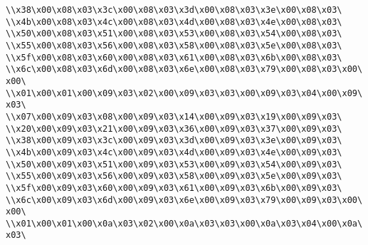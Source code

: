\verb|\\x38\x00\x08\x03\x3c\x00\x08\x03\x3d\x00\x08\x03\x3e\x00\x08\x03\|\newline
\verb|\\x4b\x00\x08\x03\x4c\x00\x08\x03\x4d\x00\x08\x03\x4e\x00\x08\x03\|\newline
\verb|\\x50\x00\x08\x03\x51\x00\x08\x03\x53\x00\x08\x03\x54\x00\x08\x03\|\newline
\verb|\\x55\x00\x08\x03\x56\x00\x08\x03\x58\x00\x08\x03\x5e\x00\x08\x03\|\newline
\verb|\\x5f\x00\x08\x03\x60\x00\x08\x03\x61\x00\x08\x03\x6b\x00\x08\x03\|\newline
\verb|\\x6c\x00\x08\x03\x6d\x00\x08\x03\x6e\x00\x08\x03\x79\x00\x08\x03\x00\x00\|\newline
\verb|\\x01\x00\x01\x00\x09\x03\x02\x00\x09\x03\x03\x00\x09\x03\x04\x00\x09\x03\|\newline
\verb|\\x07\x00\x09\x03\x08\x00\x09\x03\x14\x00\x09\x03\x19\x00\x09\x03\|\newline
\verb|\\x20\x00\x09\x03\x21\x00\x09\x03\x36\x00\x09\x03\x37\x00\x09\x03\|\newline
\verb|\\x38\x00\x09\x03\x3c\x00\x09\x03\x3d\x00\x09\x03\x3e\x00\x09\x03\|\newline
\verb|\\x4b\x00\x09\x03\x4c\x00\x09\x03\x4d\x00\x09\x03\x4e\x00\x09\x03\|\newline
\verb|\\x50\x00\x09\x03\x51\x00\x09\x03\x53\x00\x09\x03\x54\x00\x09\x03\|\newline
\verb|\\x55\x00\x09\x03\x56\x00\x09\x03\x58\x00\x09\x03\x5e\x00\x09\x03\|\newline
\verb|\\x5f\x00\x09\x03\x60\x00\x09\x03\x61\x00\x09\x03\x6b\x00\x09\x03\|\newline
\verb|\\x6c\x00\x09\x03\x6d\x00\x09\x03\x6e\x00\x09\x03\x79\x00\x09\x03\x00\x00\|\newline
\verb|\\x01\x00\x01\x00\x0a\x03\x02\x00\x0a\x03\x03\x00\x0a\x03\x04\x00\x0a\x03\|\newline
